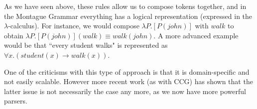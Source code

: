As we have seen above, these rules allow us to compose tokens together, and in the Montague Grammar everything has a logical representation (expressed in the $\lambda$-calculus). For instance, we would compose $\lambda P.[P(john)]$ with $walk$ to obtain $\lambda P.[P(john)](walk) \equiv walk(john)$. A more advanced example would be that ``every student walks" is represented as $\forall x.(student(x) \to walk(x))$.

\mbox{}

One of the criticisms with this type of approach \cite{clark_combining_nodate} is that it is domain-specific and not easily scalable. However more recent work (as with CCG) has shown that the latter issue is not necessarily the case any more, as we now have more powerful parsers.